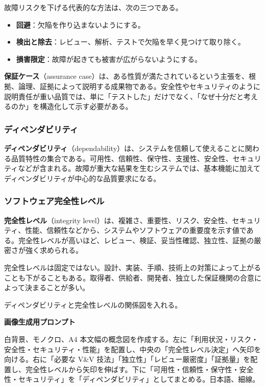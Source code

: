 \documentclass[11pt,a4paper]{article}
\newcommand{\term}[2]{\textbf{#1}（#2）}
\begin{document}
故障リスクを下げる代表的な方法は、次の三つである。
\begin{itemize}
  \item \textbf{回避}：欠陥を作り込まないようにする。
  \item \textbf{検出と除去}：レビュー、解析、テストで欠陥を早く見つけて取り除く。
  \item \textbf{損害限定}：故障が起きても被害が広がらないようにする。
\end{itemize}

\term{保証ケース}{assurance case}は、ある性質が満たされているという主張を、根拠、論理、証拠によって説明する成果物である。安全性やセキュリティのように説明責任が重い品質では、単に「テストした」だけでなく、「なぜ十分だと考えるのか」を構造化して示す必要がある。

\subsubsection{ディペンダビリティ}
\term{ディペンダビリティ}{dependability}は、システムを信頼して使えることに関わる品質特性の集合である。可用性、信頼性、保守性、支援性、安全性、セキュリティなどが含まれる。故障が重大な結果を生むシステムでは、基本機能に加えてディペンダビリティが中心的な品質要求になる。

\subsubsection{ソフトウェア完全性レベル}
\term{完全性レベル}{integrity level}は、複雑さ、重要性、リスク、安全性、セキュリティ、性能、信頼性などから、システムやソフトウェアの重要度を示す値である。完全性レベルが高いほど、レビュー、検証、妥当性確認、独立性、証拠の厳密さが強く求められる。

完全性レベルは固定ではない。設計、実装、手順、技術上の対策によって上がることも下がることもある。取得者、供給者、開発者、独立した保証機関の合意によって決まることが多い。

\begin{todobox}
ディペンダビリティと完全性レベルの関係図を入れる。\par
\textbf{画像生成用プロンプト}\par
白背景、モノクロ、A4 本文幅の概念図を作成する。左に「利用状況・リスク・安全性・セキュリティ・性能」を配置し、中央の「完全性レベル決定」へ矢印を向ける。右に「必要な V\&V 技法」「独立性」「レビュー厳密度」「証拠量」を配置し、完全性レベルから矢印を伸ばす。下に「可用性・信頼性・保守性・安全性・セキュリティ」を「ディペンダビリティ」としてまとめる。日本語、細線。
\end{todobox}
\end{document}
